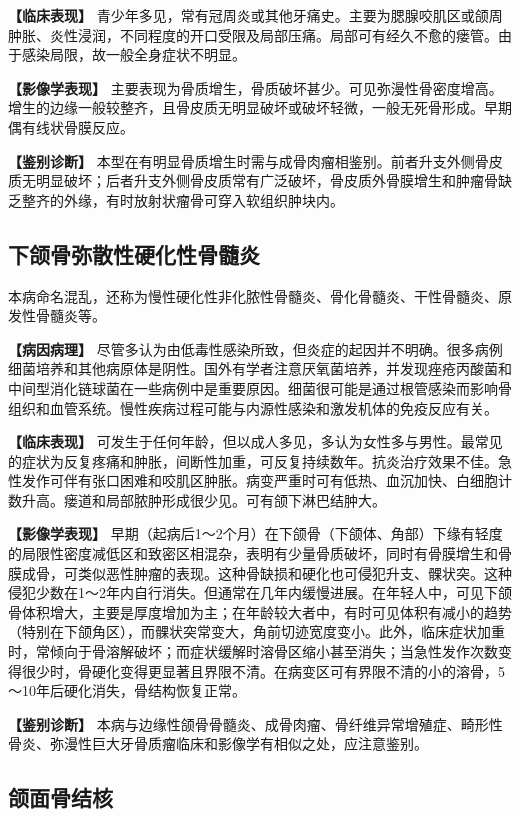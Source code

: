 \textbf{【临床表现】}
青少年多见，常有冠周炎或其他牙痛史。主要为腮腺咬肌区或颌周肿胀、炎性浸润，不同程度的开口受限及局部压痛。局部可有经久不愈的瘘管。由于感染局限，故一般全身症状不明显。

\textbf{【影像学表现】}
主要表现为骨质增生，骨质破坏甚少。可见弥漫性骨密度增高。增生的边缘一般较整齐，且骨皮质无明显破坏或破坏轻微，一般无死骨形成。早期偶有线状骨膜反应。

\textbf{【鉴别诊断】}
本型在有明显骨质增生时需与成骨肉瘤相鉴别。前者升支外侧骨皮质无明显破坏；后者升支外侧骨皮质常有广泛破坏，骨皮质外骨膜增生和肿瘤骨缺乏整齐的外缘，有时放射状瘤骨可穿入软组织肿块内。

\subsection{下颌骨弥散性硬化性骨髓炎}

本病命名混乱，还称为慢性硬化性非化脓性骨髓炎、骨化骨髓炎、干性骨髓炎、原发性骨髓炎等。

\textbf{【病因病理】}
尽管多认为由低毒性感染所致，但炎症的起因并不明确。很多病例细菌培养和其他病原体是阴性。国外有学者注意厌氧菌培养，并发现痤疮丙酸菌和中间型消化链球菌在一些病例中是重要原因。细菌很可能是通过根管感染而影响骨组织和血管系统。慢性疾病过程可能与内源性感染和激发机体的免疫反应有关。

\textbf{【临床表现】}
可发生于任何年龄，但以成人多见，多认为女性多与男性。最常见的症状为反复疼痛和肿胀，间断性加重，可反复持续数年。抗炎治疗效果不佳。急性发作可伴有张口困难和咬肌区肿胀。病变严重时可有低热、血沉加快、白细胞计数升高。瘘道和局部脓肿形成很少见。可有颌下淋巴结肿大。

\textbf{【影像学表现】}
早期（起病后1～2个月）在下颌骨（下颌体、角部）下缘有轻度的局限性密度减低区和致密区相混杂，表明有少量骨质破坏，同时有骨膜增生和骨膜成骨，可类似恶性肿瘤的表现。这种骨缺损和硬化也可侵犯升支、髁状突。这种侵犯少数在1～2年内自行消失。但通常在几年内缓慢进展。在年轻人中，可见下颌骨体积增大，主要是厚度增加为主；在年龄较大者中，有时可见体积有减小的趋势（特别在下颌角区），而髁状突常变大，角前切迹宽度变小。此外，临床症状加重时，常倾向于骨溶解破坏；而症状缓解时溶骨区缩小甚至消失；当急性发作次数变得很少时，骨硬化变得更显著且界限不清。在病变区可有界限不清的小的溶骨，5～10年后硬化消失，骨结构恢复正常。

\textbf{【鉴别诊断】}
本病与边缘性颌骨骨髓炎、成骨肉瘤、骨纤维异常增殖症、畸形性骨炎、弥漫性巨大牙骨质瘤临床和影像学有相似之处，应注意鉴别。

\subsection{颌面骨结核}

